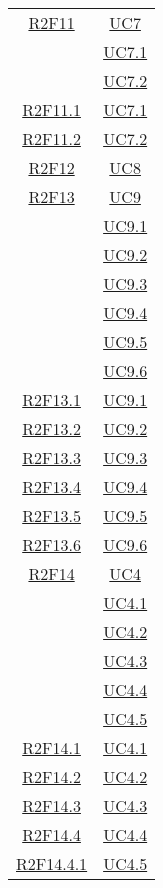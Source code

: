 \begin{longtable}{|c|c|}
\hline
\hyperlink{R2F11}{R2F11} & \hyperlink{UC7}{UC7}\\
& \hyperlink{UC7.1}{UC7.1}\\
& \hyperlink{UC7.2}{UC7.2}\\
\hline
\hyperlink{R2F11.1}{R2F11.1} & \hyperlink{UC7.1}{UC7.1}\\
\hline
\hyperlink{R2F11.2}{R2F11.2} & \hyperlink{UC7.2}{UC7.2}\\
\hline
\hyperlink{R2F12}{R2F12} & \hyperlink{UC8}{UC8}\\
\hline
\hyperlink{R2F13}{R2F13} & \hyperlink{UC9}{UC9}\\
& \hyperlink{UC9.1}{UC9.1}\\
& \hyperlink{UC9.2}{UC9.2}\\
& \hyperlink{UC9.3}{UC9.3}\\
& \hyperlink{UC9.4}{UC9.4}\\
& \hyperlink{UC9.5}{UC9.5}\\
& \hyperlink{UC9.6}{UC9.6}\\
\hline
\hyperlink{R2F13.1}{R2F13.1} & \hyperlink{UC9.1}{UC9.1}\\
\hline
\hyperlink{R2F13.2}{R2F13.2} & \hyperlink{UC9.2}{UC9.2}\\
\hline
\hyperlink{R2F13.3}{R2F13.3} & \hyperlink{UC9.3}{UC9.3}\\
\hline
\hyperlink{R2F13.4}{R2F13.4} & \hyperlink{UC9.4}{UC9.4}\\
\hline
\hyperlink{R2F13.5}{R2F13.5} & \hyperlink{UC9.5}{UC9.5}\\
\hline
\hyperlink{R2F13.6}{R2F13.6} & \hyperlink{UC9.6}{UC9.6}\\
\hline
\hyperlink{R2F14}{R2F14} & \hyperlink{UC4}{UC4}\\
& \hyperlink{UC4.1}{UC4.1}\\
& \hyperlink{UC4.2}{UC4.2}\\
& \hyperlink{UC4.3}{UC4.3}\\
& \hyperlink{UC4.4}{UC4.4}\\
& \hyperlink{UC4.5}{UC4.5}\\
\hline
\hyperlink{R2F14.1}{R2F14.1} & \hyperlink{UC4.1}{UC4.1}\\
\hline
\hyperlink{R2F14.2}{R2F14.2} & \hyperlink{UC4.2}{UC4.2}\\
\hline
\hyperlink{R2F14.3}{R2F14.3} & \hyperlink{UC4.3}{UC4.3}\\
\hline
\hyperlink{R2F14.4}{R2F14.4} & \hyperlink{UC4.4}{UC4.4}\\
\hline
\hyperlink{R2F14.4.1}{R2F14.4.1} & \hyperlink{UC4.5}{UC4.5}\\

\end{longtable}
